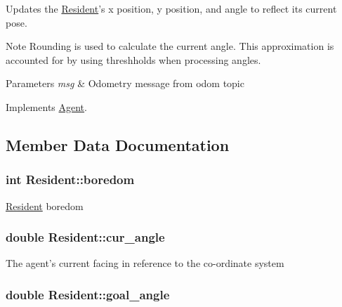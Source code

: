 Updates the \hyperlink{classResident}{Resident}'s x position, y position, and angle to reflect its current pose. 

\begin{DoxyNote}{Note}
Rounding is used to calculate the current angle. This approximation is accounted for by using threshholds when processing angles. 
\end{DoxyNote}

\begin{DoxyParams}{Parameters}
{\em msg} & Odometry message from odom topic \\
\hline
\end{DoxyParams}


Implements \hyperlink{classAgent}{Agent}.



\subsection{Member Data Documentation}
\hypertarget{classResident_acc61e75ef963ee7a6945b4d2ae9c55e6}{
\subsubsection[{boredom}]{\setlength{\rightskip}{0pt plus 5cm}int Resident\-::boredom\hspace{0.3cm}{\ttfamily [protected]}}}\label{classResident_acc61e75ef963ee7a6945b4d2ae9c55e6}
\hyperlink{classResident}{Resident} boredom \hypertarget{classResident_a4781565db7a2e58566d2120623fbc13e}{
\subsubsection[{cur\-\_\-angle}]{\setlength{\rightskip}{0pt plus 5cm}double Resident\-::cur\-\_\-angle\hspace{0.3cm}{\ttfamily [protected]}}}\label{classResident_a4781565db7a2e58566d2120623fbc13e}
The agent's current facing in reference to the co-\/ordinate system \hypertarget{classResident_a194117576f1937cac43ac1b05b884085}{
\subsubsection[{goal\-\_\-angle}]{\setlength{\rightskip}{0pt plus 5cm}double Resident\-::goal\-\_\-angle\hspace{0.3cm}{\ttfamily [protected]}}}\label{classResident_a194117576f1937cac43ac1b05b884085}
